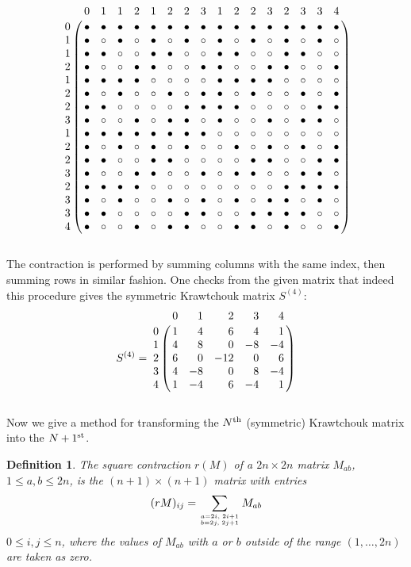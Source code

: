 \documentclass[12pt]{article}
\newtheorem{definition}[theorem]{Definition}
\numberwithin{equation}{section}
\begin{document}
$$
\bordermatrix{
  &0  &1  &1  &2   &1  &2  &2  &3   &1  &2  &2  &3   &2  &3  &3  &4   \cr 
0 &\a &\a &\a &\a  &\a &\a &\a &\a  &\a &\a &\a &\a  &\a &\a &\a &\a  \cr
1 &\a &\b &\a &\b  &\a &\b &\a &\b  &\a &\b &\a &\b  &\a &\b &\a &\b  \cr 
1 &\a &\a &\b &\b  &\a &\a &\b &\b  &\a &\a &\b &\b  &\a &\a &\b &\b  \cr
2 &\a &\b &\b &\a  &\a &\b &\b &\a  &\a &\b &\b &\a  &\a &\b &\b &\a  \cr
%
1 &\a &\a &\a &\a  &\b &\b &\b &\b  &\a &\a &\a &\a  &\b &\b &\b &\b  \cr
2 &\a &\b &\a &\b  &\b &\a &\b &\a  &\a &\b &\a &\b  &\b &\a &\b &\a  \cr
2 &\a &\a &\b &\b  &\b &\b &\a &\a  &\a &\a &\b &\b  &\b &\b &\a &\a  \cr
3 &\a &\b &\b &\a  &\b &\a &\a &\b  &\a &\b &\b &\a  &\b &\a &\a &\b  \cr
%
1 &\a &\a &\a &\a  &\a &\a &\a &\a  &\b &\b &\b &\b  &\b &\b &\b &\b  \cr
2 &\a &\b &\a &\b  &\a &\b &\a &\b  &\b &\a &\b &\a  &\b &\a &\b &\a  \cr
2 &\a &\a &\b &\b  &\a &\a &\b &\b  &\b &\b &\a &\a  &\b &\b &\a &\a  \cr
3 &\a &\b &\b &\a  &\a &\b &\b &\a  &\b &\a &\a &\b  &\b &\a &\a &\b  \cr
%
2 &\a &\a &\a &\a  &\b &\b &\b &\b  &\b &\b &\b &\b  &\a &\a &\a &\a  \cr
3 &\a &\b &\a &\b  &\b &\a &\b &\a  &\b &\a &\b &\a  &\a &\b &\a &\b  \cr
3 &\a &\a &\b &\b  &\b &\b &\a &\a  &\b &\b &\a &\a  &\a &\a &\b &\b  \cr
4 &\a &\b &\b &\a  &\b &\a &\a &\b  &\b &\a &\a &\b  &\a &\b &\b &\a  \cr
}
$$
~
\\
The contraction is performed by summing columns with the same index,
then summing rows in similar fashion.
One checks from the given matrix that
indeed this procedure gives the symmetric Krawtchouk
matrix $S^{(4)}$:  
$$
S^{(4)}=
\bordermatrix{
   &\hfill0  &\hfill1  &\hfill2  &\hfill3   &\hfill4   \cr 
0  &\hfill1  &\hfill4  &\hfill6  &\hfill4   &\hfill1   \cr
1  &\hfill4  &\hfill8  &\hfill0  &\hfill-8  &\hfill-4  \cr
2  &\hfill6  &\hfill0  &\hfill-12 &\hfill0   &\hfill6   \cr
3  &\hfill4  &\hfill-8 &\hfill0  &\hfill8   &\hfill-4  \cr
4  &\hfill1  &\hfill-4 &\hfill6  &\hfill-4  &\hfill1  \cr
}
$$
~
\\

Now we give a method for transforming the $N^{\rm th}$ (symmetric) Krawtchouk matrix
into the $N+1^{\rm st}$. 


\begin{definition}\rm
\label{d:shuffle}
The {\sl square contraction $r(M)$} of a $2n\times 2n$ matrix $M_{ab}$, \hfill\break
$1\le a,b\le 2n$, is the $(n+1)\times (n+1)$ matrix with entries
\begin{equation*}
(rM)_{ij} = \sum_{a=2i,\; 2i+1 \atop b=2j,\; 2j+1}
M_{ab}
\end{equation*}
$0\le i,j\le n$,  where the values of $M_{ab}$ with $a$ or $b$ outside of the range $(1,\ldots, 2n)$ 
are taken as zero. 
\end{definition}
\end{document}
